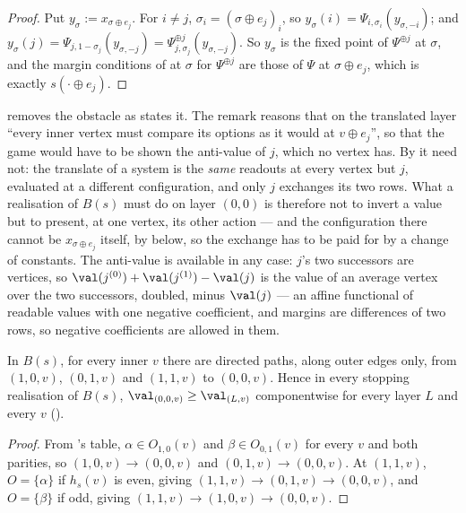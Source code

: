 \begin{proof}
Put $y_\sigma:=x_{\sigma\oplus e_j}$.  For $i\ne j$,
$\sigma_i=(\sigma\oplus e_j)_i$, so
$y_\sigma(i)=\Psi_{i,\sigma_i}(y_{\sigma,-i})$; and
$y_\sigma(j)=\Psi_{j,1-\sigma_j}(y_{\sigma,-j})=
\Psi^{\oplus j}_{j,\sigma_j}(y_{\sigma,-j})$.  So $y_\sigma$ is the fixed
point of $\Psi^{\oplus j}$ at $\sigma$, and the margin conditions of
 at $\sigma$ for $\Psi^{\oplus j}$ are those of $\Psi$
at $\sigma\oplus e_j$, which is exactly $s(\cdot\oplus e_j)$.
\end{proof}

\begin{remark}\label{lvl:no-antivalue}
 removes the obstacle as  states it.
The remark reasons that on the translated layer ``every inner vertex must
compare its options as it would at $v\oplus e_j$'', so that the game would have
to be shown the anti-value of $j$, which no vertex has.  By  it
need not: the translate of a system is the \emph{same} readouts at every vertex
but $j$, evaluated at a different configuration, and only $j$ exchanges its two
rows.  What a realisation of $B(s)$ must do on layer $(0,0)$ is therefore not
to invert a value but to present, at one vertex, its other action --- and the
configuration there cannot be $x_{\sigma\oplus e_j}$ itself, by
 below, so the exchange has to be paid for by a change of
constants.  The anti-value is available in any case: $j$'s two successors are
vertices, so $\val(j^{(0)})+\val(j^{(1)})-\val(j)$ is the value of an average
vertex over the two successors, doubled, minus $\val(j)$ --- an affine
functional of readable values with one negative coefficient, and margins are
differences of two rows, so negative coefficients are allowed in them.
\end{remark}

\begin{lemma}\label{lvl:layer-order}
In $B(s)$, for every inner $v$ there are directed paths, along outer edges
only, from $(1,0,v)$, $(0,1,v)$ and $(1,1,v)$ to $(0,0,v)$.  Hence in every
stopping realisation of $B(s)$, $\val_{(0,0,v)}\ge\val_{(L,v)}$ componentwise for
every layer $L$ and every $v$ ().
\end{lemma}

\begin{proof}
From 's table, $\alpha\in O_{1,0}(v)$ and $\beta\in O_{0,1}(v)$
for every $v$ and both parities, so $(1,0,v)\to(0,0,v)$ and
$(0,1,v)\to(0,0,v)$.  At $(1,1,v)$, $O=\{\alpha\}$ if $h_s(v)$ is even, giving
$(1,1,v)\to(0,1,v)\to(0,0,v)$, and $O=\{\beta\}$ if odd, giving
$(1,1,v)\to(1,0,v)\to(0,0,v)$.
\end{proof}


